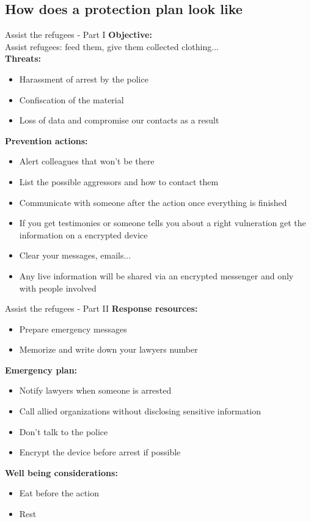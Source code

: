 \documentclass[11pt]{beamer}
\begin{document}
\subsection{How does a protection plan look like}
\begin{frame}{Assist the refugees - Part I}
\textbf{Objective:}\\
Assist refugees: feed them, give them collected clothing...\\
\textbf{Threats:}\\
\begin{itemize}
\item Harassment of arrest by the police
\item Confiscation of the material
\item Loss of  data and compromise our contacts as a result
\end{itemize}
\textbf{Prevention actions:}\\
\begin{itemize}
\item Alert colleagues that won't be there
\item List the possible aggressors and how to contact them
\item Communicate with someone after the action once everything is finished
\item If you get testimonies or  someone tells you about a right vulneration get the information on a encrypted device
\item Clear your messages, emails...
\item Any live information will be shared via an encrypted messenger and only with people involved
\end{itemize}
\end{frame}
\begin{frame}{Assist the refugees - Part II}
\textbf{Response resources:}\\
\begin{itemize}
\item Prepare emergency messages
\item Memorize and  write down your lawyers number
\end{itemize}
\textbf{Emergency plan:}\\
\begin{itemize}
\item Notify lawyers when someone is arrested
\item Call allied  organizations without disclosing sensitive information
\item Don't talk to the police
\item Encrypt the device before arrest if possible
\end{itemize}
\textbf{Well being considerations:}\\
\begin{itemize}
\item Eat before the action
\item Rest
\end{itemize}
\end{frame}
\end{document}
